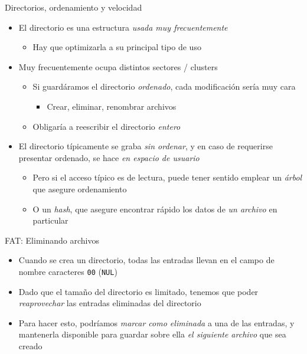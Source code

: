 \documentclass[presentation]{beamer}
\begin{document}
\begin{frame}[label={sec:orgf061fcb}]{Directorios, ordenamiento y velocidad}
\begin{itemize}
\item El directorio es una estructura \emph{usada muy frecuentemente}
\begin{itemize}
\item Hay que optimizarla a su principal tipo de uso
\end{itemize}
\item Muy frecuentemente ocupa distintos sectores / clusters
\begin{itemize}
\item Si guardáramos el directorio \emph{ordenado}, cada modificación sería
muy cara
\begin{itemize}
\item Crear, eliminar, renombrar archivos
\end{itemize}
\item Obligaría a reescribir el directorio \emph{entero}
\end{itemize}
\item El directorio típicamente se graba \emph{sin ordenar}, y en caso de
requerirse presentar ordenado, se hace \emph{en espacio de usuario}
\begin{itemize}
\item Pero si el acceso típico es de lectura, puede tener sentido
emplear un \emph{árbol} que asegure ordenamiento
\item O un \emph{hash}, que asegure encontrar rápido los datos de \emph{un
archivo} en particular
\end{itemize}
\end{itemize}
\end{frame}

\begin{frame}[label={sec:org2379ce2},fragile]{FAT: Eliminando archivos}
 \begin{itemize}
\item Cuando se crea un directorio, todas las entradas llevan en el campo
de nombre caracteres \texttt{00} (\texttt{NUL})
\item Dado que el tamaño del directorio es limitado, tenemos que poder
\emph{reaprovechar} las entradas eliminadas del directorio
\item Para hacer esto, podríamos \emph{marcar como eliminada} a una de las
entradas, y mantenerla disponible para guardar sobre ella \emph{el
siguiente archivo} que sea creado
\end{itemize}
\end{frame}
\end{document}
